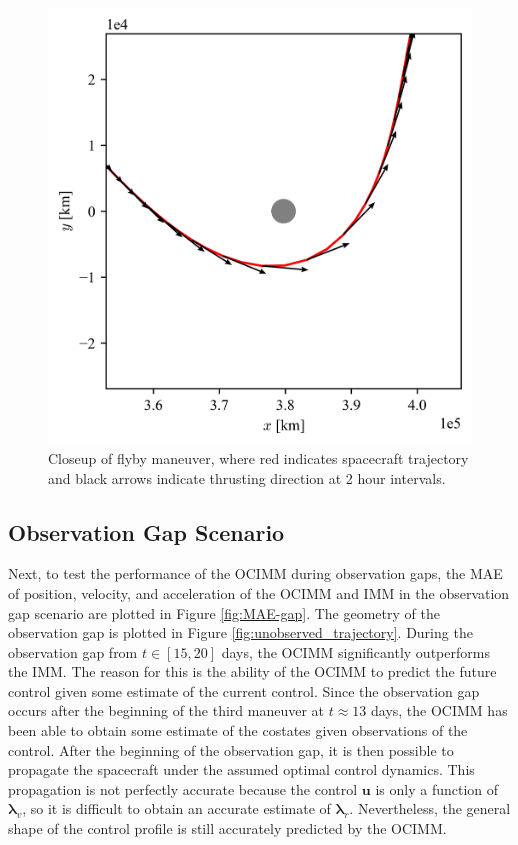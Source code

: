 \documentclass[letterpaper, preprint, paper,11pt]{AAS}	%
\begin{document}
\begin{figure}
    \centering
    \includegraphics[width=0.4\linewidth]{Figures/closeup.png}
    \caption{Closeup of flyby maneuver, where red indicates spacecraft trajectory and black arrows indicate thrusting direction at 2 hour intervals.}
    \label{fig:closeup}
\end{figure}

\subsection{Observation Gap Scenario}

Next, to test the performance of the OCIMM during observation gaps, the MAE of position, velocity, and acceleration of the OCIMM and IMM in the observation gap scenario are plotted in Figure \ref{fig:MAE-gap}. The geometry of the observation gap is plotted in Figure \ref{fig:unobserved_trajectory}. During the observation gap from $t \in [15, 20]$ days, the OCIMM significantly outperforms the IMM. The reason for this is the ability of the OCIMM to predict the future control given some estimate of the current control. Since the observation gap occurs after the beginning of the third maneuver at $t \approx 13$ days, the OCIMM has been able to obtain some estimate of the costates given observations of the control. After the beginning of the observation gap, it is then possible to propagate the spacecraft under the assumed optimal control dynamics. This propagation is not perfectly accurate because the control $\bm{u}$ is only a function of $\bm{\lambda}_v$, so it is difficult to obtain an accurate estimate of $\bm{\lambda}_r$. Nevertheless, the general shape of the control profile is still accurately predicted by the OCIMM.
\end{document}
